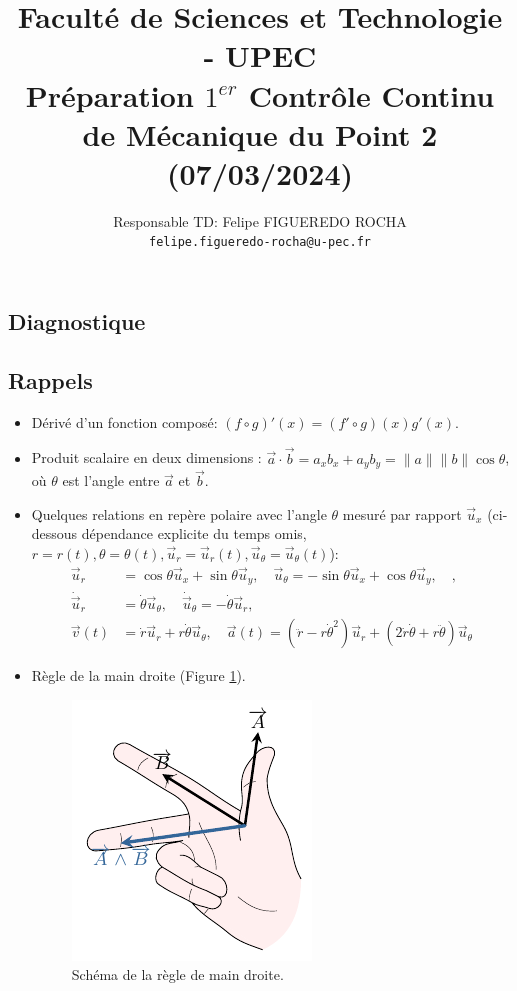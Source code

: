 \documentclass[french,10pt]{article}
\title{ \large
Faculté de Sciences et Technologie - UPEC \\
Préparation $1^{er}$ Contrôle Continu de Mécanique du Point 2 (07/03/2024)\\ }
\author{Responsable TD: Felipe FIGUEREDO ROCHA \\ \texttt{felipe.figueredo-rocha@u-pec.fr}}
\date{}
\begin{document}
	
	\maketitle

	\subsection*{Diagnostique}
	\subsection*{Rappels}
	\begin{itemize}
		\item Dérivé d'un fonction composé: $(f \circ g)'(x) = (f' \circ g)(x) g'(x)$.
		\item Produit scalaire en deux dimensions : $\vec{a} \cdot \vec{b} = a_x b_x + a_y b_y = \|a\| \|b\| \cos{\theta}$, où $\theta$ est l'angle entre $\vec{a}$ et $\vec{b}$.
		\item Quelques relations en repère polaire avec l'angle $\theta$ mesuré par rapport $\Vec{u}_x$ (ci-dessous dépendance explicite du temps omis, $r=r(t) , \theta=\theta(t), \Vec{u}_r = \Vec{u}_r(t), \Vec{u}_{\theta} = \Vec{u}_{\theta}(t)$):
		\begin{align*}
			\Vec{u}_r &= \cos{\theta} \Vec{u}_x + \sin{\theta} \Vec{u}_y, \quad \Vec{u}_{\theta} = -\sin{\theta} \Vec{u}_x + \cos{\theta} \Vec{u}_y, \quad, \\
			\dot{\Vec{u}}_r &= \dot{\theta} \Vec{u}_{\theta}, \quad  \dot{\Vec{u}}_{\theta} = -\dot{\theta} \Vec{u}_{r}, \\
			\Vec{v}(t) &= \dot{r} \Vec{u}_r + r \dot{\theta} \Vec{u}_{\theta}, \quad
			\Vec{a}(t) = (\ddot{r} - r\dot{\theta}^2) \Vec{u}_r + (2 \dot{r} \dot{\theta} + r \ddot{\theta}) \Vec{u}_{\theta}
		\end{align*}
	\item Règle de la main droite (Figure \ref{fig:regledelamaindroite}).
	\begin{figure}[h!]
		\centering
		\includegraphics[width=0.35\linewidth]{regle_de_la_main_droite}
		\caption{Schéma de la règle de main droite.}
		\label{fig:regledelamaindroite}
	\end{figure}
	 
	\end{itemize}
\end{document}

